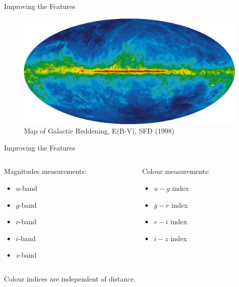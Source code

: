 \documentclass{beamer}
\begin{document}
\begin{frame}{Improving the Features}
	\begin{figure}
		\centering
		\includegraphics[width=\textwidth]{images/lrg_ebv_image}
		\caption{Map of Galactic Reddening, E(B-V), SFD (1998)\footnotemark}
	\end{figure}
\end{frame}

\begin{frame}{Improving the Features}
	\begin{columns}[T]
		\begin{column}{.45\textwidth}
			Magnitudes measurements:
			\begin{itemize}
				\item $u$-band
				\item $g$-band
				\item $r$-band
				\item $i$-band
				\item $z$-band
			\end{itemize}
		\end{column}
		\begin{column}{.45\textwidth}
			Colour measurements:
			\begin{itemize}
				\item $u-g$ index
				\item $g-r$ index
				\item $r-i$ index
				\item $i-z$ index
			\end{itemize}
		\end{column}
	\end{columns}
	\vspace{2em}
	Colour indices are independent of distance.
\end{frame}
\end{document}
